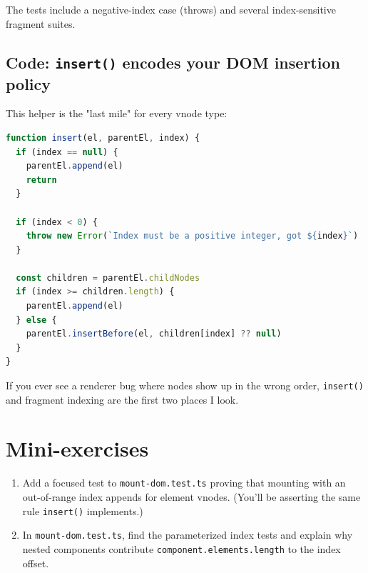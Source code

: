 The tests include a negative-index case (throws) and several index-sensitive fragment suites.

\subsection*{Code: \texttt{insert()} encodes your DOM insertion policy}
This helper is the "last mile" for every vnode type:

\begin{lstlisting}[language=JavaScript]
function insert(el, parentEl, index) {
  if (index == null) {
    parentEl.append(el)
    return
  }

  if (index < 0) {
    throw new Error(`Index must be a positive integer, got ${index}`)
  }

  const children = parentEl.childNodes
  if (index >= children.length) {
    parentEl.append(el)
  } else {
    parentEl.insertBefore(el, children[index] ?? null)
  }
}
\end{lstlisting}

If you ever see a renderer bug where nodes show up in the wrong order, \texttt{insert()} and fragment indexing are the first two places I look.

\section{Mini-exercises}
\begin{enumerate}
  \item Add a focused test to \texttt{mount-dom.test.ts} proving that mounting with an out-of-range index appends for element vnodes. (You'll be asserting the same rule \texttt{insert()} implements.)
  \item In \texttt{mount-dom.test.ts}, find the parameterized index tests and explain why nested components contribute \texttt{component.elements.length} to the index offset.
\end{enumerate}

